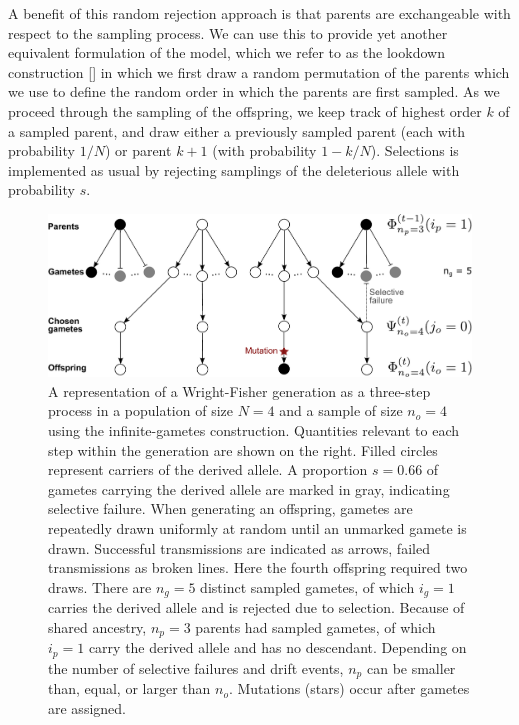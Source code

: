 \documentclass[9pt,twocolumn,twoside,lineno]{gsajnl}
\begin{document}
A benefit of this random rejection approach is that parents are exchangeable with respect to the sampling process. We can use this to provide yet another equivalent formulation of the model, which we refer to as the lookdown construction \ref{} in which we first draw a random permutation of the parents which we use to define the random order in which the parents are first sampled. As we proceed through the sampling of the offspring, we keep track of highest order $k$ of a sampled parent, and draw either a previously sampled parent (each with probability $1/N$) or parent $k+1$ (with probability $1-k/N$).  Selections is implemented as usual by rejecting samplings of the deleterious allele with probability $s.$  
  
 \begin{figure}
  \centering
  \includegraphics[width=\columnwidth]{fig/WF_schematic.pdf}

  \caption{\label{fig_schematic_gametes}
    A representation of a Wright-Fisher generation as a three-step process in a population of size $N=4$ and a sample of size $n_o=4$ using the infinite-gametes  construction. Quantities relevant to each step within the generation are shown on the right.  Filled circles represent carriers of the derived allele. A proportion $s=0.66$ of gametes carrying the derived allele are marked in gray, indicating selective failure. When generating an offspring, gametes are repeatedly drawn uniformly at random until an unmarked gamete is drawn. 
Successful transmissions are indicated as arrows, failed transmissions as broken lines.   
   Here the fourth offspring required two draws. There are $n_g=5$ distinct sampled gametes, of which $i_g=1$ carries the derived allele and is rejected due to selection. Because of shared ancestry, $n_p=3$ parents had sampled gametes, of which  $i_p=1$ carry the derived allele and has no descendant.  Depending on the number of selective failures and drift events, $n_p$ can be smaller than, equal, or larger than $n_o$.  Mutations (stars) occur after gametes are assigned.}
\end{figure}
 
\end{document}
